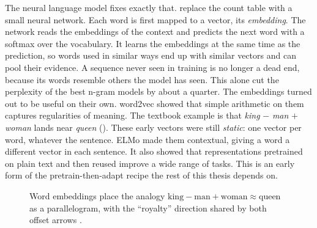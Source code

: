 The neural language model fixes exactly that. \citet{bengio2003neural} replace the
count table with a small neural network. Each word is first mapped to a vector, its
\emph{embedding}. The network reads the embeddings of the context and predicts the
next word with a softmax over the vocabulary. It learns the embeddings at
the same time as the prediction, so words used in similar ways end up with similar
vectors and can pool their evidence. A sequence never seen in training is no longer
a dead end, because its words resemble others the model has seen. This alone cut
the perplexity of the best n-gram models by about a quarter. The embeddings turned
out to be useful on their own. word2vec \citep{mikolov-etal-2013-linguistic} showed
that simple arithmetic on them captures regularities of meaning. The textbook
example is that \emph{king} $-$ \emph{man} $+$ \emph{woman} lands near \emph{queen}
().
These early vectors were still \emph{static}: one vector per word, whatever the
sentence. ELMo \citep{peters-etal-2018-deep} made them contextual, giving a word a
different vector in each sentence. It also showed that representations pretrained on
plain text and then reused improve a wide range of tasks. This is an early form of
the pretrain-then-adapt recipe the rest of this thesis depends on.

\begin{figure}[t]
\centering
{}
\caption{Word embeddings place the analogy
$\text{king}-\text{man}+\text{woman}\approx\text{queen}$ as a parallelogram, with the
``royalty'' direction shared by both offset arrows
\citep{mikolov-etal-2013-linguistic}.}
\label{fig:lm-word2vec}
\end{figure}

